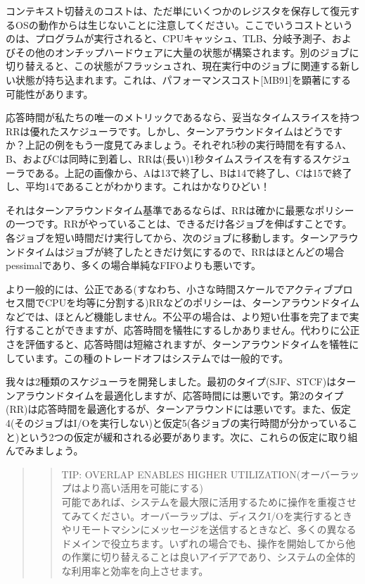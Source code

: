 コンテキスト切替えのコストは、ただ単にいくつかのレジスタを保存して復元するOSの動作からは生じないことに注意してください。ここでいうコストというのは、プログラムが実行されると、CPUキャッシュ、TLB、分岐予測子、およびその他のオンチップハードウェアに大量の状態が構築されます。別のジョブに切り替えると、この状態がフラッシュされ、現在実行中のジョブに関連する新しい状態が持ち込まれます。これは、パフォーマンスコスト{[}MB91{]}を顕著にする可能性があります。

応答時間が私たちの唯一のメトリックであるなら、妥当なタイムスライスを持つRRは優れたスケジューラです。しかし、ターンアラウンドタイムはどうですか？上記の例をもう一度見てみましょう。それぞれ5秒の実行時間を有するA、B、およびCは同時に到着し、RRは(長い)1秒タイムスライスを有するスケジューラである。上記の画像から、Aは13で終了し、Bは14で終了し、Cは15で終了し、平均14であることがわかります。これはかなりひどい！

それはターンアラウンドタイム基準であるならば、RRは確かに最悪なポリシーの一つです。RRがやっていることは、できるだけ各ジョブを伸ばすことです。各ジョブを短い時間だけ実行してから、次のジョブに移動します。ターンアラウンドタイムはジョブが終了したときだけ気にするので、RRはほとんどの場合pessimalであり、多くの場合単純なFIFOよりも悪いです。

より一般的には、公正である(すなわち、小さな時間スケールでアクティブプロセス間でCPUを均等に分割する)RRなどのポリシーは、ターンアラウンドタイムなどでは、ほとんど機能しません。不公平の場合は、より短い仕事を完了まで実行することができますが、応答時間を犠牲にするしかありません。代わりに公正さを評価すると、応答時間は短縮されますが、ターンアラウンドタイムを犠牲にしています。この種のトレードオフはシステムでは一般的です。

我々は2種類のスケジューラを開発しました。最初のタイプ(SJF、STCF)はターンアラウンドタイムを最適化しますが、応答時間には悪いです。第2のタイプ(RR)は応答時間を最適化するが、ターンアラウンドには悪いです。また、仮定4(そのジョブはI/Oを実行しない)と仮定5(各ジョブの実行時間が分かっていること)という2つの仮定が緩和される必要があります。次に、これらの仮定に取り組んでみましょう。

\begin{quote}
\begin{quote}
TIP: OVERLAP ENABLES HIGHER
UTILIZATION(オーバーラップはより高い活用を可能にする)\\
可能であれば、システムを最大限に活用するために操作を重複させてみてください。オーバーラップは、ディスクI/Oを実行するときやリモートマシンにメッセージを送信するときなど、多くの異なるドメインで役立ちます。いずれの場合でも、操作を開始してから他の作業に切り替えることは良いアイデアであり、システムの全体的な利用率と効率を向上させます。
\end{quote}
\end{quote}

